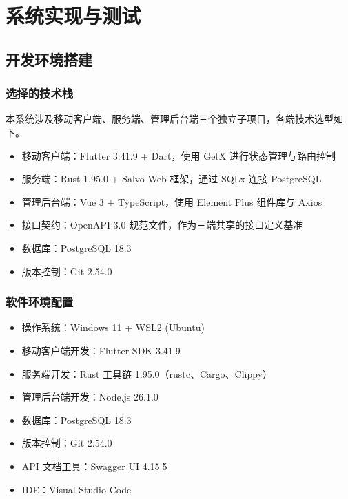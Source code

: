 
\chapter{系统实现与测试}

\section{开发环境搭建}

\subsection{选择的技术栈}

本系统涉及移动客户端、服务端、管理后台端三个独立子项目，各端技术选型如下。

\begin{itemize}
  \item 移动客户端：Flutter 3.41.9 + Dart，使用 GetX 进行状态管理与路由控制
  \item 服务端：Rust 1.95.0 + Salvo Web 框架，通过 SQLx 连接 PostgreSQL
  \item 管理后台端：Vue 3 + TypeScript，使用 Element Plus 组件库与 Axios
  \item 接口契约：OpenAPI 3.0 规范文件，作为三端共享的接口定义基准
  \item 数据库：PostgreSQL 18.3
  \item 版本控制：Git 2.54.0
\end{itemize}

\subsection{软件环境配置}

\begin{itemize}
  \item 操作系统：Windows 11 + WSL2 (Ubuntu)
  \item 移动客户端开发：Flutter SDK 3.41.9
  \item 服务端开发：Rust 工具链 1.95.0（rustc、Cargo、Clippy）
  \item 管理后台端开发：Node.js 26.1.0
  \item 数据库：PostgreSQL 18.3 
  \item 版本控制：Git 2.54.0
  \item API 文档工具：Swagger UI 4.15.5
  \item IDE：Visual Studio Code 
\end{itemize}

